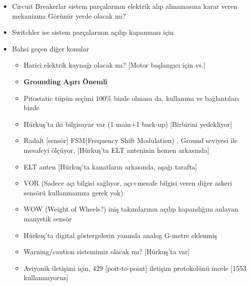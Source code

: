 \documentclass[a4paper,12pt]{article}
\begin{document}
\begin{itemize}
	\item Circuit Breakerlar sistem parçalarının elektrik alıp almamasına karar veren mekanizma
		\subitem *Görünür yerde olacak mı?
	\item Switchler ise sistem parçalarının açılıp kapanması için
	\item Bahsi geçen diğer konular
		\begin{itemize}
			\item Harici elektrik kaynağı olacak mı? [Motor başlangıcı için vs.]
			\item \textbf{Grounding Aşırı Önemli}
			\item Pitostatic tüpün seçimi $100\%$ bizde olmasa da, kullanımı ve bağlantıları bizde
 			\item Hürkuş'ta iki bilgisayar var (1 main+1 back-up) [Birbirini yedekliyor]
			\item Radalt [sensör]
				\subitem *FSM(Frequency Shift Modulation) , Ground seviyesi ile mesafeyi ölçüyor, [Hürkuş'ta ELT anteninin hemen arkasında]
			\item ELT anten [Hürkuş'ta kanatların arkasında, aşağı tarafta]
			\item VOR (Sadece açı bilgisi sağlıyor, açı+mesafe bilgisi veren diğer askeri sensörü kullanmamıza gerek yok)
			
			\item WOW (Weight of Wheels?) iniş takımlarının açılıp kapandığını anlayan manyetik sensör
			\item Hürkuş'ta digital göstergelerin yanında analog G-metre eklenmiş
			\item Warning/caution sistemimiz olacak mı? [Hürkuş'ta var]
			\item Aviyonik iletişimi için, 429 [poit-to-point] iletişim protokolünü incele [1553 kullanmıyoruz] 
		\end{itemize}
	
\end{itemize}



\end{document}
